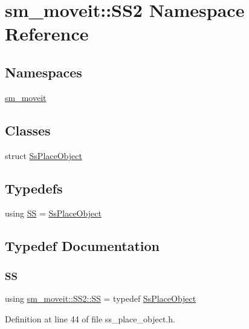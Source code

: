 \hypertarget{namespacesm__moveit_1_1SS2}{}\section{sm\+\_\+moveit\+:\+:S\+S2 Namespace Reference}
\label{namespacesm__moveit_1_1SS2}
\subsection*{Namespaces}
\begin{DoxyCompactItemize}
\item 
 \hyperlink{namespacesm__moveit_1_1SS2_1_1sm__moveit}{sm\+\_\+moveit}
\end{DoxyCompactItemize}
\subsection*{Classes}
\begin{DoxyCompactItemize}
\item 
struct \hyperlink{structsm__moveit_1_1SS2_1_1SsPlaceObject}{Ss\+Place\+Object}
\end{DoxyCompactItemize}
\subsection*{Typedefs}
\begin{DoxyCompactItemize}
\item 
using \hyperlink{namespacesm__moveit_1_1SS2_af2aad268be87b0f3360fd87ba135d957}{SS} = \hyperlink{structsm__moveit_1_1SS2_1_1SsPlaceObject}{Ss\+Place\+Object}
\end{DoxyCompactItemize}


\subsection{Typedef Documentation}
\mbox{\label{namespacesm__moveit_1_1SS2_af2aad268be87b0f3360fd87ba135d957}} 
\subsubsection{\texorpdfstring{SS}{SS}}
{\footnotesize\ttfamily using \hyperlink{namespacesm__moveit_1_1SS2_af2aad268be87b0f3360fd87ba135d957}{sm\+\_\+moveit\+::\+S\+S2\+::\+SS} = typedef \hyperlink{structsm__moveit_1_1SS2_1_1SsPlaceObject}{Ss\+Place\+Object}}



Definition at line 44 of file ss\+\_\+place\+\_\+object.\+h.

